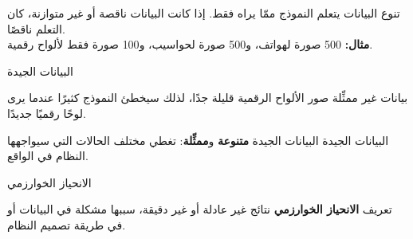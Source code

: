 \documentclass[aspectratio=169, 11pt, xcolor={table}]{beamer}
\begin{document}
\begin{frame}{تنوع البيانات}
    يتعلم النموذج ممّا يراه فقط. إذا كانت البيانات ناقصة أو غير متوازنة، كان التعلم ناقصًا.\\
    \textbf{مثال:} 500 صورة لهواتف، و500 صورة لحواسيب، و100 صورة فقط لألواح رقمية.
    \begin{center}
    \end{center}
\end{frame}

\begin{frame}{البيانات الجيدة}
    \begin{obox}{\faExclamationTriangle\quad بيانات غير ممثِّلة}
        صور الألواح الرقمية قليلة جدًا،
        لذلك سيخطئ النموذج كثيرًا عندما يرى لوحًا رقميًا جديدًا.
    \end{obox}
    \begin{tbox}{\faCheckCircle\quad البيانات الجيدة}
        البيانات الجيدة \textbf{متنوعة} و\textbf{ممثِّلة}:
        تغطي مختلف الحالات التي سيواجهها النظام في الواقع.
    \end{tbox}
\end{frame}

\begin{frame}{الانحياز الخوارزمي}
    \begin{tbox}{\faLightbulb\quad تعريف}
        \textbf{الانحياز الخوارزمي} نتائج غير عادلة أو غير دقيقة،
        سببها مشكلة في البيانات أو في طريقة تصميم النظام.
    \end{tbox}
    \begin{center}
    \end{center}
\end{frame}
\end{document}
